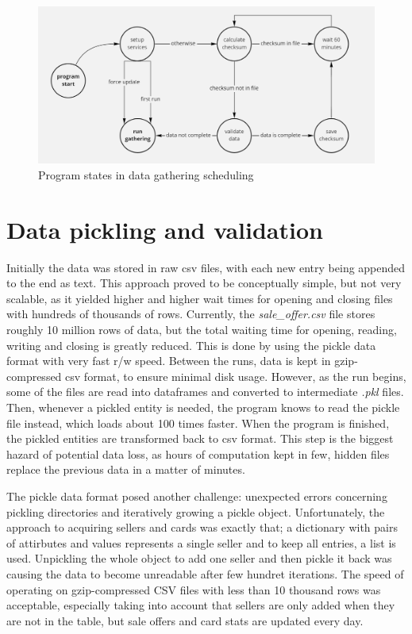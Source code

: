 \begin{figure}[ht]
      \centering
      \includegraphics[width=\textwidth]{figures/gathering_schedule.png}
      \caption{Program states in data gathering scheduling}
      \label{fig:gathering_schedule}
\end{figure}

\section{Data pickling and validation}
Initially the data was stored in raw csv files, with each new entry being appended to the end as text. This approach proved to be conceptually simple, but not very scalable, as it yielded higher and higher wait times for opening and closing files with hundreds of thousands of rows. Currently, the \textit{sale\_offer.csv} file stores roughly 10 million rows of data, but the total waiting time for opening, reading, writing and closing is greatly reduced. This is done by using the pickle data format with very fast r/w speed. Between the runs, data is kept in gzip-compressed csv format, to ensure minimal disk usage. However, as the run begins, some of the files are read into dataframes and converted to intermediate \textit{.pkl} files. Then, whenever a pickled entity is needed, the program knows to read the pickle file instead, which loads about 100 times faster. When the program is finished, the pickled entities are transformed back to csv format. This step is the biggest hazard of potential data loss, as hours of computation kept in few, hidden files replace the previous data in a matter of minutes. \par
The pickle data format posed another challenge: unexpected errors concerning pickling directories and iteratively growing a pickle object. Unfortunately, the approach to acquiring sellers and cards was exactly that; a dictionary with pairs of attirbutes and values represents a single seller and to keep all entries, a list is used. Unpickling the whole object to add one seller and then pickle it back was causing the data to become unreadable after few hundret iterations. The speed of operating on gzip-compressed CSV files with less than 10 thousand rows was acceptable, especially taking into account that sellers are only added when they are not in the table, but sale offers and card stats are updated every day. \par

